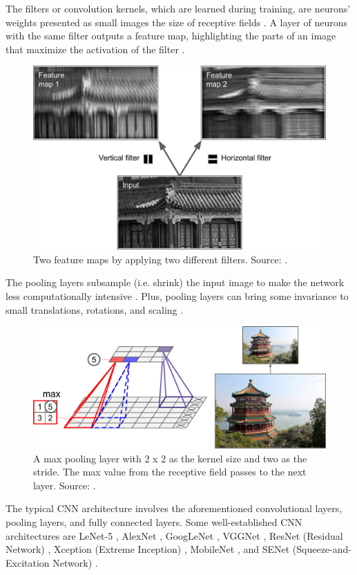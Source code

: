 \documentclass[a4paper, 11pt, oneside]{article}
\begin{document}
The filters or convolution kernels, which are learned during training, are neurons' weights presented as small images
the size of receptive fields \cite{geron2019hands}. A layer of neurons with the same filter outputs a feature map,
highlighting the parts of an image that maximize the activation of the filter \cite{geron2019hands}.

\begin{figure}[ht]
  \begin{center}
    \includegraphics[width=.6\textwidth]{filters.png}
  \end{center}
  \caption{Two feature maps by applying two different filters. Source: \cite{geron2019hands}.}
\end{figure}

The pooling layers subsample (i.e. shrink) the input image to make the network less computationally intensive
\cite{geron2019hands}. Plus, pooling layers can bring some invariance to small translations, rotations, and scaling
\cite{geron2019hands}.

\begin{figure}[ht]
  \begin{center}
    \includegraphics[width=.5\textwidth]{max_pooling.png}
  \end{center}
  \caption{A max pooling layer with 2 x 2 as the kernel size and two as the stride. The max value from the receptive
  field passes to the next layer. Source: \cite{geron2019hands}.}
\end{figure}

The typical CNN architecture involves the aforementioned convolutional layers, pooling layers, and fully connected layers.
Some well-established CNN architectures are LeNet-5 \cite{lecun1998gradient}, AlexNet \cite{krizhevsky2012imagenet},
GoogLeNet \cite{szegedy2015going}, VGGNet \cite{simonyan2014very}, ResNet (Residual Network) \cite{he2016deep}, Xception
(Extreme Inception) \cite{chollet2017xception}, MobileNet \cite{howard2017mobilenets, sandler2018mobilenetv2},
and SENet (Squeeze-and-Excitation Network) \cite{hu2018squeeze}.
\end{document}
